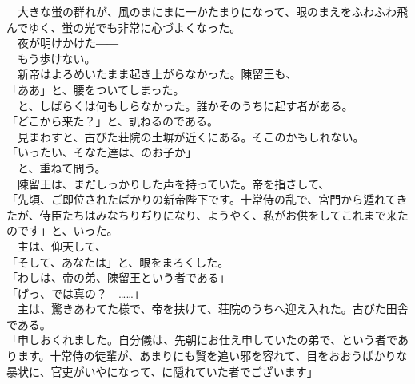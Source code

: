 \documentclass[
  paper=a5,
  fontsize=10pt,
  jafontsize=9.5pt,
  tate,                  %
  open_bracket_pos=nibu, %
]{jlreq}
\begin{document}
　大きな蛍の群れが、風のまにまに一かたまりになって、眼のまえをふわふわ飛んでゆく、蛍の光でも非常に心づよくなった。\\


　夜が明けかけた――\\


　もう歩けない。\\


　新帝はよろめいたまま起き上がらなかった。陳留王も、\\


「ああ」と、腰をついてしまった。\\


　と、しばらくは何もしらなかった。誰かそのうちに起す者がある。\\


「どこから来た？」と、訊ねるのである。\\


　見まわすと、古びた荘院の土塀が近くにある。そこのかもしれない。\\


「いったい、そなた達は、のお子か」\\


　と、重ねて問う。\\


　陳留王は、まだしっかりした声を持っていた。帝を指さして、\\


「先頃、ご即位されたばかりの新帝陛下です。十常侍の乱で、宮門から遁れてきたが、侍臣たちはみなちりぢりになり、ようやく、私がお供をしてこれまで来たのです」と、いった。\\


　主は、仰天して、\\


「そして、あなたは」と、眼をまろくした。\\


「わしは、帝の弟、陳留王という者である」\\


「げっ、では真の？　……」\\


　主は、驚きあわてた様で、帝を扶けて、荘院のうちへ迎え入れた。古びた田舎である。\\


「申しおくれました。自分儀は、先朝にお仕え申していたの弟で、という者であります。十常侍の徒輩が、あまりにも賢を追い邪を容れて、目をおおうばかりな暴状に、官吏がいやになって、に隠れていた者でございます」\\
\end{document}
